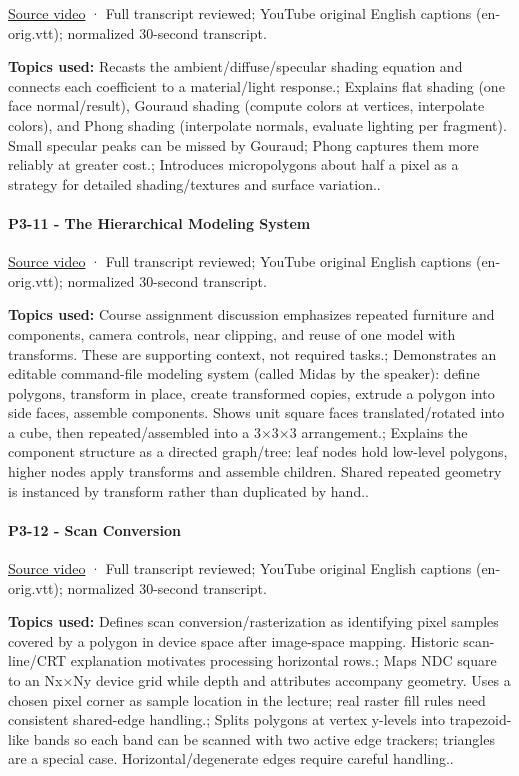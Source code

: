 \href{https://www.youtube.com/watch?v=Is6D5rnWEvs}{Source video} · Full transcript reviewed; YouTube original English captions (en-orig.vtt); normalized 30-second transcript.

\textbf{Topics used:} Recasts the ambient/diffuse/specular shading equation and connects each coefficient to a material/light response.; Explains flat shading (one face normal/result), Gouraud shading (compute colors at vertices, interpolate colors), and Phong shading (interpolate normals, evaluate lighting per fragment). Small specular peaks can be missed by Gouraud; Phong captures them more reliably at greater cost.; Introduces micropolygons about half a pixel as a strategy for detailed shading/textures and surface variation..

\paragraph{P3-11 - The Hierarchical Modeling System}\label{p3-11---the-hierarchical-modeling-system}

\href{https://www.youtube.com/watch?v=D8ZYHXom0qk}{Source video} · Full transcript reviewed; YouTube original English captions (en-orig.vtt); normalized 30-second transcript.

\textbf{Topics used:} Course assignment discussion emphasizes repeated furniture and components, camera controls, near clipping, and reuse of one model with transforms. These are supporting context, not required tasks.; Demonstrates an editable command-file modeling system (called Midas by the speaker): define polygons, transform in place, create transformed copies, extrude a polygon into side faces, assemble components. Shows unit square faces translated/rotated into a cube, then repeated/assembled into a 3×3×3 arrangement.; Explains the component structure as a directed graph/tree: leaf nodes hold low-level polygons, higher nodes apply transforms and assemble children. Shared repeated geometry is instanced by transform rather than duplicated by hand..

\paragraph{P3-12 - Scan Conversion}\label{p3-12---scan-conversion}

\href{https://www.youtube.com/watch?v=23HEwdcphg4}{Source video} · Full transcript reviewed; YouTube original English captions (en-orig.vtt); normalized 30-second transcript.

\textbf{Topics used:} Defines scan conversion/rasterization as identifying pixel samples covered by a polygon in device space after image-space mapping. Historic scan-line/CRT explanation motivates processing horizontal rows.; Maps NDC square to an Nx×Ny device grid while depth and attributes accompany geometry. Uses a chosen pixel corner as sample location in the lecture; real raster fill rules need consistent shared-edge handling.; Splits polygons at vertex y-levels into trapezoid-like bands so each band can be scanned with two active edge trackers; triangles are a special case. Horizontal/degenerate edges require careful handling..

